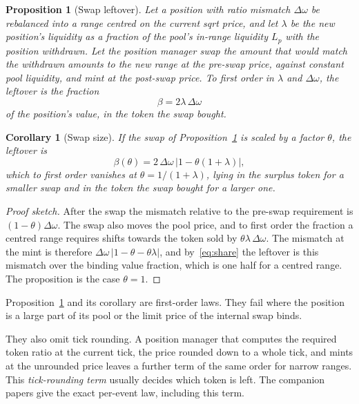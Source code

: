 \documentclass[11pt,a4paper]{article}
\theoremstyle{siphon}
\newtheorem{corollary}{Corollary}[theorem]
\newtheorem{proposition}[theorem]{Proposition}
\begin{document}
\begin{proposition}[Swap leftover]\label{prop:leftover}
Let a position with ratio mismatch $\Delta\omega$ be rebalanced into a range centred on the current sqrt price, and let $\lambda$ be the new position's liquidity as a fraction of the pool's in-range liquidity $L_p$ with the position withdrawn. Let the position manager swap the amount that would match the withdrawn amounts to the new range at the pre-swap price, against constant pool liquidity, and mint at the post-swap price. To first order in $\lambda$ and $\Delta\omega$, the leftover is the fraction
\[
\beta = 2\lambda\,\Delta\omega
\]
of the position's value, in the token the swap bought.
\end{proposition}

\begin{corollary}[Swap size]\label{cor:swap-size}
If the swap of Proposition~\ref{prop:leftover} is scaled by a factor $\theta$, the leftover is
\[
\beta(\theta) = 2\,\Delta\omega\,\bigl|1 - \theta(1+\lambda)\bigr| ,
\]
which to first order vanishes at $\theta = 1/(1+\lambda)$, lying in the surplus token for a smaller swap and in the token the swap bought for a larger one.
\end{corollary}

\begin{proof}[Proof sketch]
After the swap the mismatch relative to the pre-swap requirement is $(1-\theta)\Delta\omega$. The swap also moves the pool price, and to first order the fraction a centred range requires shifts towards the token sold by $\theta\lambda\,\Delta\omega$. The mismatch at the mint is therefore $\Delta\omega\,|1 - \theta - \theta\lambda|$, and by~\eqref{eq:share} the leftover is this mismatch over the binding value fraction, which is one half for a centred range. The proposition is the case $\theta = 1$.
\end{proof}

\noindent Proposition~\ref{prop:leftover} and its corollary are first-order laws. They fail where the position is a large part of its pool or the limit price of the internal swap binds.

They also omit tick rounding. A position manager that computes the required token ratio at the current tick, the price rounded down to a whole tick, and mints at the unrounded price leaves a further term of the same order for narrow ranges. This \emph{tick-rounding term} usually decides which token is left. The companion papers give the exact per-event law, including this term.\cite{ryan2026master,ryan2026oqm}
\end{document}
